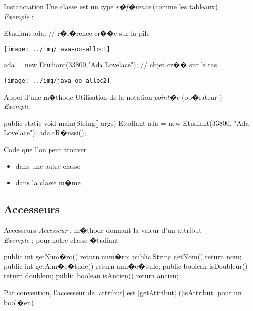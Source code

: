 \begin{frame}[fragile]{Instanciation}
Une classe est un type \emph{r�f�rence} (comme les tableaux)
\medskip
\\\emph{Exemple} :
\begin{Java}
    Etudiant ada;  // r�f�rence cr��e sur la pile
\end{Java}
\vspace{-10pt}
\begin{center}\texttt{[image: ../img/java-oo-alloc1]}\end{center}
\begin{Java}
    ada = new Etudiant(33800,"Ada Lovelace"); // objet cr�� sur le tas
\end{Java}
\vspace{-10pt}
\begin{center}\texttt{[image: ../img/java-oo-alloc2]}\end{center}
\end{frame}

\begin{frame}[fragile]{Appel d'une m�thode}
Utilisation de la notation \textit{point�e} (op�rateur )
\\\bigskip
\emph{Exemple}
\begin{Java}
public static void main(String[] args) {
    Etudiant ada = new Etudiant(33800, "Ada Lovelace");
    ada.aR�ussi();
}
\end{Java}
\bigskip
Code que l'on peut trouver
\begin{itemize}
\item dans une autre classe
\item dans la classe m�me
\end{itemize}
\end{frame}

\subsection{Accesseurs}

\begin{frame}[fragile]{Accesseurs}
\emph{Accesseur} : m�thode donnant la valeur d'un attribut 
\\\bigskip
\emph{Exemple} : pour notre classe �tudiant
\begin{Java}
  public int getNum�ro() {return num�ro;}
  public String getNom() {return nom;}
  public int getAnn�e�tude() {return ann�e�tude;}
  public boolean isDoubleur() {return doubleur;}
  public boolean isAncien() {return ancien;}
\end{Java}
\bigskip
Par convention, l'accesseur de \java|attribut| est \java|getAttribut| 
(\java|isAttribut| pour un bool�en)
\end{frame}

